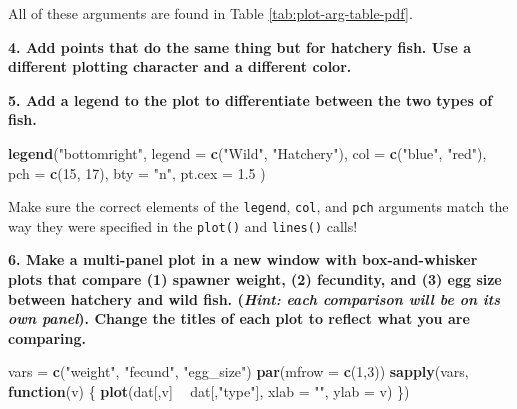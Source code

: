 \documentclass[]{book}
\newenvironment{Shaded}{\begin{snugshade}}{\end{snugshade}}
\newcommand{\ControlFlowTok}[1]{\textcolor[rgb]{0.13,0.29,0.53}{\textbf{#1}}}
\newcommand{\DataTypeTok}[1]{\textcolor[rgb]{0.13,0.29,0.53}{#1}}
\newcommand{\DecValTok}[1]{\textcolor[rgb]{0.00,0.00,0.81}{#1}}
\newcommand{\FloatTok}[1]{\textcolor[rgb]{0.00,0.00,0.81}{#1}}
\newcommand{\KeywordTok}[1]{\textcolor[rgb]{0.13,0.29,0.53}{\textbf{#1}}}
\newcommand{\NormalTok}[1]{#1}
\newcommand{\OperatorTok}[1]{\textcolor[rgb]{0.81,0.36,0.00}{\textbf{#1}}}
\newcommand{\StringTok}[1]{\textcolor[rgb]{0.31,0.60,0.02}{#1}}
\begin{document}
All of these arguments are found in Table \ref{tab:plot-arg-table-pdf}.

\textbf{4. Add points that do the same thing but for hatchery fish. Use a different plotting character and a different color.}

\begin{Shaded}
\end{Shaded}

\textbf{5. Add a legend to the plot to differentiate between the two types of fish.}

\begin{Shaded}
\begin{Highlighting}[]
\KeywordTok{legend}\NormalTok{(}\StringTok{"bottomright"}\NormalTok{,}
       \DataTypeTok{legend =} \KeywordTok{c}\NormalTok{(}\StringTok{"Wild"}\NormalTok{, }\StringTok{"Hatchery"}\NormalTok{),}
       \DataTypeTok{col =} \KeywordTok{c}\NormalTok{(}\StringTok{"blue"}\NormalTok{, }\StringTok{"red"}\NormalTok{),}
       \DataTypeTok{pch =} \KeywordTok{c}\NormalTok{(}\DecValTok{15}\NormalTok{, }\DecValTok{17}\NormalTok{),}
       \DataTypeTok{bty =} \StringTok{"n"}\NormalTok{,}
       \DataTypeTok{pt.cex =} \FloatTok{1.5}
\NormalTok{)}
\end{Highlighting}
\end{Shaded}

Make sure the correct elements of the \texttt{legend}, \texttt{col}, and \texttt{pch} arguments match the way they were specified in the \texttt{plot()} and \texttt{lines()} calls!

\textbf{6. Make a multi-panel plot in a new window with box-and-whisker plots that compare (1) spawner weight, (2) fecundity, and (3) egg size between hatchery and wild fish. (\emph{Hint: each comparison will be on its own panel}). Change the titles of each plot to reflect what you are comparing.}

\begin{Shaded}
\begin{Highlighting}[]
\NormalTok{vars =}\StringTok{ }\KeywordTok{c}\NormalTok{(}\StringTok{"weight"}\NormalTok{, }\StringTok{"fecund"}\NormalTok{, }\StringTok{"egg_size"}\NormalTok{)}
\KeywordTok{par}\NormalTok{(}\DataTypeTok{mfrow =} \KeywordTok{c}\NormalTok{(}\DecValTok{1}\NormalTok{,}\DecValTok{3}\NormalTok{))}
\KeywordTok{sapply}\NormalTok{(vars, }\ControlFlowTok{function}\NormalTok{(v) \{}
  \KeywordTok{plot}\NormalTok{(dat[,v] }\OperatorTok{~}\StringTok{ }\NormalTok{dat[,}\StringTok{"type"}\NormalTok{], }\DataTypeTok{xlab =} \StringTok{""}\NormalTok{, }\DataTypeTok{ylab =}\NormalTok{ v)}
\NormalTok{\})}
\end{Highlighting}
\end{Shaded}
\end{document}
